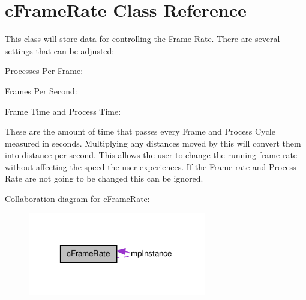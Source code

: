 \hypertarget{classc_frame_rate}{
\section{cFrameRate Class Reference}
\label{classc_frame_rate}
}


This class will store data for controlling the Frame Rate. There are several settings that can be adjusted:\par
 Processes Per Frame:\par
 \par
 Frames Per Second:\par
 \par
 Frame Time and Process Time:\par
 These are the amount of time that passes every Frame and Process Cycle measured in seconds. Multiplying any distances moved by this will convert them into distance per second. This allows the user to change the running frame rate without affecting the speed the user experiences. If the Frame rate and Process Rate are not going to be changed this can be ignored.  




Collaboration diagram for cFrameRate:
\nopagebreak
\begin{figure}[H]
\begin{center}
\leavevmode
\includegraphics[width=220pt]{classc_frame_rate__coll__graph}
\end{center}
\end{figure}

